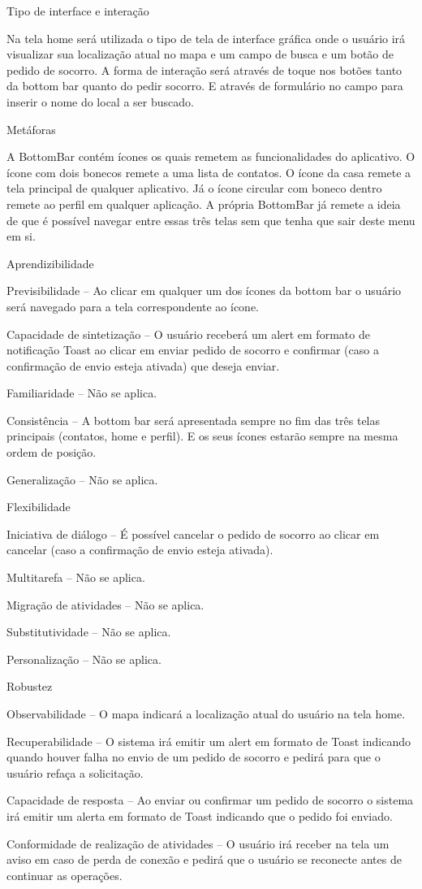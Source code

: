 \begin{alineas}
  \item Tipo de interface e interação
  
  Na tela home será utilizada o tipo de tela de interface gráfica onde o usuário irá visualizar sua localização atual no mapa e um campo de busca e um botão de pedido de socorro. A forma de interação será através de toque nos botões tanto da bottom bar quanto do pedir socorro. E através de formulário no campo para inserir o nome do local a ser buscado.
  \item Metáforas
  
  A BottomBar contém ícones os quais remetem as funcionalidades do aplicativo. O ícone com dois bonecos remete a uma lista de contatos. O ícone da casa remete a tela principal de qualquer aplicativo. Já o ícone circular com boneco dentro remete ao perfil em qualquer aplicação. A própria BottomBar já remete a ideia de que é possível navegar entre essas três telas sem que tenha que sair deste menu em si. 
  \item Aprendizibilidade
  
  Previsibilidade – Ao clicar em qualquer um dos ícones da bottom bar o usuário será navegado para a tela correspondente ao ícone.
   
Capacidade de sintetização – O usuário receberá um alert em formato de notificação Toast ao clicar em enviar pedido de socorro e confirmar (caso a confirmação de envio esteja ativada) que deseja enviar.

Familiaridade – Não se aplica.

Consistência – A bottom bar será apresentada sempre no fim das três telas principais (contatos, home e perfil). E os seus ícones estarão sempre na mesma ordem de posição.

Generalização – Não se aplica.
  \item Flexibilidade
  
  Iniciativa de diálogo – É possível cancelar o pedido de socorro ao clicar em cancelar (caso a confirmação de envio esteja ativada).
  
 Multitarefa – Não se aplica.
 
Migração de atividades – Não se aplica.

Substitutividade – Não se aplica.

Personalização – Não se aplica.
  \item Robustez
  
  Observabilidade – O mapa indicará a localização atual do usuário na tela home.
  
Recuperabilidade – O sistema irá emitir um alert em formato de Toast indicando quando houver falha no envio de um pedido de socorro e pedirá para que o usuário refaça a solicitação.

Capacidade de resposta – Ao enviar ou confirmar um pedido de socorro o sistema irá emitir um alerta em formato de Toast indicando que o pedido foi enviado.

Conformidade de realização de atividades – O usuário irá receber na tela um aviso em caso de perda de conexão e pedirá que o usuário se reconecte antes de continuar as operações. 
\end{alineas}

